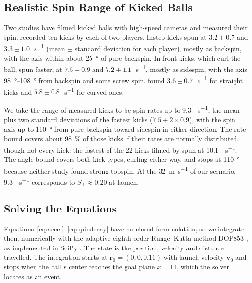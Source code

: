 \documentclass[10pt,a4paper]{article}
\begin{document}
\subsection{Realistic Spin Range of Kicked Balls}
\label{sec:kick-spin}

Two studies have filmed kicked balls with high-speed cameras and measured
their spin. \citet{tsukada2011} recorded ten kicks by each of two players.
Instep kicks spun at $3.2 \pm 0.7$ and $3.3 \pm 1.0$\,\si{\rev\per\second}
(mean $\pm$ standard deviation for each player), mostly as backspin, with the
axis within about \SI{25}{\degree} of pure backspin. In-front kicks, which
curl the ball, spun faster, at $7.5 \pm 0.9$ and
$7.2 \pm 1.1$\,\si{\rev\per\second}, mostly as sidespin, with the axis
\SIrange{98}{108}{\degree} from backspin and some screw spin.
\citet{whiteside2010} found $3.6 \pm 0.7$\,\si{\rev\per\second} for straight
kicks and $5.8 \pm 0.8$\,\si{\rev\per\second} for curved ones.

We take the range of measured kicks to be spin rates up to
\SI{9.3}{\rev\per\second}, the mean plus two standard deviations of the
fastest kicks ($7.5 + 2 \times 0.9$), with the spin axis up to
\SI{110}{\degree} from pure backspin toward sidespin in either direction. The
rate bound covers about \SI{98}{\percent} of those kicks if their rates are
normally distributed, though not every kick: the fastest of the 22 kicks
filmed by \citet{tsukada2008} spun at \SI{10.1}{\rev\per\second}. The angle
bound covers both kick types, curling either way, and stops at
\SI{110}{\degree} because neither study found strong topspin. At the
\SI{32}{\metre\per\second} of our scenario, \SI{9.3}{\rev\per\second}
corresponds to $S_\perp \approx 0.20$ at launch.

\subsection{Solving the Equations}
\label{sec:integration}

Equations~\eqref{eq:accel}--\eqref{eq:spindecay} have no closed-form solution,
so we integrate them numerically with the adaptive eighth-order Runge--Kutta
method DOP853 \citep{hairer1993}, as implemented in SciPy \citep{scipy2020}.
The state is the position, velocity and distance travelled. The integration
starts at $\bm{r}_0 = (0, 0, 0.11)$ with launch velocity $\bm{v}_0$ and stops
when the ball's center reaches the goal plane $x = 11$, which the solver
locates as an event.
\end{document}
